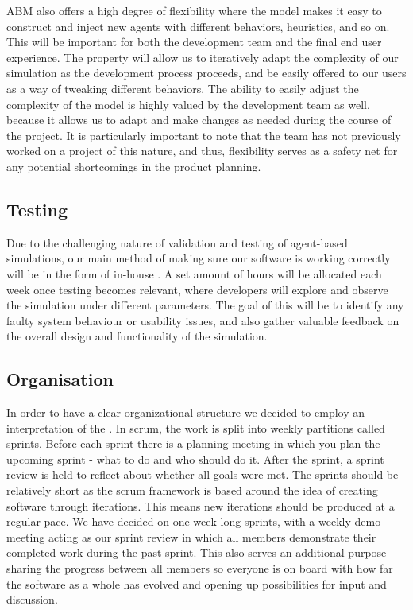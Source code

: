     ABM also offers a high degree of flexibility where the model makes it easy to construct and inject new agents with different behaviors, heuristics, and so on. This will be important for both the development team and the final end user experience. The property will allow us to iteratively adapt the complexity of our simulation as the development process proceeds, and be easily offered to our users as a way of tweaking different behaviors. The ability to easily adjust the complexity of the model is highly valued by the development team as well, because it allows us to adapt and make changes as needed during the course of the project. It is particularly important to note that the team has not previously worked on a project of this nature, and thus, flexibility serves as a safety net for any potential shortcomings in the product planning.

\subsection{Testing}
    Due to the challenging nature of validation and testing of agent-based simulations, our main method of making sure our software is working correctly will be in the form of in-house . A set amount of hours will be allocated each week once testing becomes relevant, where developers will explore and observe the simulation under different parameters. The goal of this will be to identify any faulty system behaviour or usability issues, and also gather valuable feedback on the overall design and functionality of the simulation.

\subsection{Organisation}
    In order to have a clear organizational structure we decided to employ an interpretation of the  \cite{scrum}. In scrum, the work is split into weekly partitions called sprints. Before each sprint there is a planning meeting in which you plan the upcoming sprint - what to do and who should do it. After the sprint, a sprint review is held to reflect about whether all goals were met. The sprints should be relatively short as the scrum framework is based around the idea of creating software through iterations. This means new iterations should be produced at a regular pace. We have decided on one week long sprints, with a weekly demo meeting acting as our sprint review in which all members demonstrate their completed work during the past sprint. This also serves an additional purpose - sharing the progress between all members so everyone is on board with how far the software as a whole has evolved and opening up possibilities for input and discussion.

